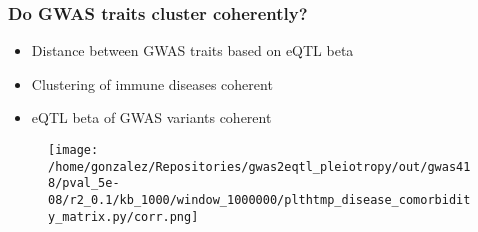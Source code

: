 \documentclass{beamer}
\begin{document}
\begin{frame}
\frametitle{Do GWAS traits cluster coherently?}

\begin{itemize}
\item Distance between GWAS traits based on eQTL beta
\item Clustering of immune diseases coherent
\item eQTL beta of GWAS variants coherent
\end{itemize}

\begin{figure}[!]
\texttt{[image: /home/gonzalez/Repositories/gwas2eqtl\_pleiotropy/out/gwas418/pval\_5e-08/r2\_0.1/kb\_1000/window\_1000000/plthtmp\_disease\_comorbidity\_matrix.py/corr.png]}
\end{figure}

\end{frame}



\end{document}
